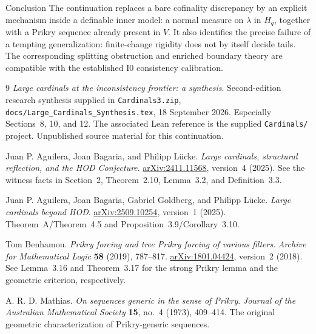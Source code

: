 \documentclass[11pt,letterpaper]{article}
\theoremstyle{definition}
\numberwithin{equation}{section}
\newcommand{\Izero}{\mathrm{I0}}
\newcommand{\arxiv}[1]{\href{https://arxiv.org/abs/#1}{arXiv:#1}}
\begin{document}
\begin{assessment}{Conclusion}
The continuation replaces a bare cofinality discrepancy by an explicit mechanism inside a definable inner model: a normal measure on $\lambda$ in $H_q$, together with a Prikry sequence already present in $V$. It also identifies the precise failure of a tempting generalization: finite-change rigidity does not by itself decide tails. The corresponding splitting obstruction and enriched boundary theory are compatible with the established $\Izero$ consistency calibration.
\end{assessment}

\begin{thebibliography}{9}
\emph{Large cardinals at the inconsistency frontier: a synthesis}.
Second-edition research synthesis supplied in \nolinkurl{Cardinals3.zip},
\nolinkurl{docs/Large_Cardinals_Synthesis.tex}, 18 September 2026.
Especially Sections~8, 10, and 12. The associated Lean reference is the supplied
\nolinkurl{Cardinals/} project. Unpublished source material for this continuation.

Juan P. Aguilera, Joan Bagaria, and Philipp L\"ucke.
\emph{Large cardinals, structural reflection, and the HOD Conjecture}.
\arxiv{2411.11568}, version~4 (2025).
See the witness facts in Section~2, Theorem~2.10, Lemma~3.2,
and Definition~3.3.

Juan P. Aguilera, Joan Bagaria, Gabriel Goldberg, and Philipp L\"ucke.
\emph{Large cardinals beyond HOD}.
\arxiv{2509.10254}, version~1 (2025).
Theorem~A/Theorem~4.5 and Proposition~3.9/Corollary~3.10.

Tom Benhamou.
\emph{Prikry forcing and tree Prikry forcing of various filters}.
\emph{Archive for Mathematical Logic} \textbf{58} (2019), 787--817.
\arxiv{1801.04424}, version~2 (2018).
See Lemma~3.16 and Theorem~3.17 for the strong Prikry lemma
and the geometric criterion, respectively.

A. R. D. Mathias.
\emph{On sequences generic in the sense of Prikry}.
\emph{Journal of the Australian Mathematical Society}
\textbf{15}, no.~4 (1973), 409--414.
The original geometric characterization of Prikry-generic sequences.
\end{thebibliography}
\end{document}
